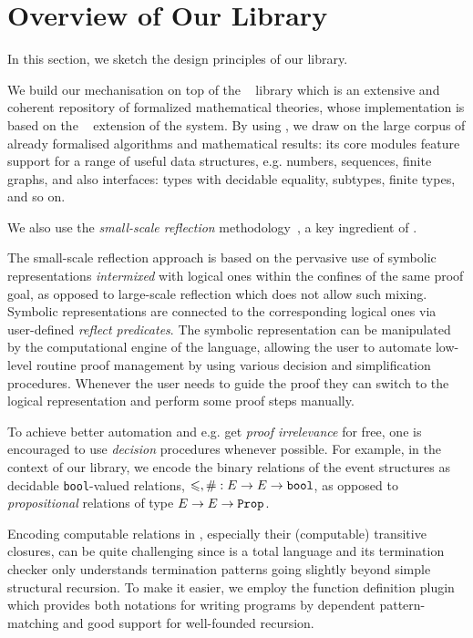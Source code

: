 \section{Overview of Our Library}

In this section, we sketch the design principles of our library. 

We build our mechanisation on top of the \mathcomp~\cite{Mahboubi-Tassi:MATHCOMP17} library 
which is an extensive and coherent repository of formalized mathematical theories,
whose implementation is based on the \ssreflect~\cite{Gonthier-al:SSR2016} extension of the \coq system.
By using \mathcomp, we draw on the large corpus of already formalised algorithms and mathematical results:
its core modules feature support for a range of useful data structures,
e.g. numbers, sequences, finite graphs,
and also interfaces: types with decidable equality, subtypes, finite types, and so on.

We also use the \emph{small-scale reflection} 
methodology~\cite{Gonthier-Assia:SSR2010, Gonthier-al:SSR2016}, 
a key ingredient of \ssreflect. 

The small-scale reflection approach is based on 
the pervasive use of symbolic representations \emph{intermixed}
with logical ones within the confines of the same proof goal,
as opposed to large-scale reflection which does not allow such mixing.
Symbolic representations are connected to the corresponding logical ones
via user-defined \emph{reflect predicates}.
The symbolic representation can be manipulated 
by the computational engine of the language, 
allowing the user to automate low-level routine 
proof management by using various decision 
and simplification procedures.
Whenever the user needs to guide the proof 
they can switch to the logical representation
and perform some proof steps manually. 

To achieve better automation and e.g. get \emph{proof irrelevance}
for free, one is encouraged
to use \emph{decision} procedures whenever possible.
For example, in the context of our library, 
we encode the binary relations of the event structures
as decidable \texttt{bool}-valued relations, 
\ie $\leqslant, \# : E \rightarrow E \rightarrow \texttt{bool}$,
as opposed to \emph{propositional} 
relations of type $E \rightarrow E \rightarrow \texttt{Prop}$.

Encoding computable relations in \coq,
especially their (computable) transitive closures,
can be quite challenging since \coq is a total language and
its termination checker only understands termination patterns
going slightly beyond simple structural recursion.
To make it easier, we employ the \equations function definition plugin~%
\cite{Sozeau-Mangin:ICFP2019}
which provides both notations for writing programs by dependent pattern-matching
and good support for well-founded recursion.

